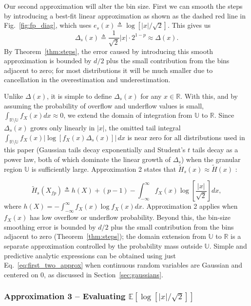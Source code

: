 \documentclass[12pt,onecolumn, margin=1in]{IEEEtran}
\newcommand{\bracket}[1]{\left[ #1 \right]}
\newcommand{\Ht}{\tilde{H}}
\begin{document}
Our second approximation will alter the bin size. First we can smooth the steps by introducing a best-fit linear approximation as shown as the dashed red line in Fig.~\ref{fig:fp_diag}, which uses $e_{s}(x) \triangleq \log[|x|/\sqrt{2}]$. This gives us
\begin{equation}
    \label{eq:step_approx}
    \Delta_s(x) \triangleq \frac{1}{\sqrt{2}}|x| \cdot 2^{1-p} \approx \Delta(x).
\end{equation}
By Theorem~\ref{thm:steps}, the error caused by introducing this smooth approximation is bounded by $d/2$ plus the small contribution from the bins adjacent to zero; for most distributions it will be much smaller due to cancellation in the overestimation and underestimation.

Unlike $\Delta(x)$, it is simple to define $\Delta_s(x)$ for any $x \in \mathbb{R}$. With this, and by assuming the probability of overflow and underflow values is small, $\int_{\mathbb{R} \setminus \mathbb{U}} f_X(x) dx \approx 0$, we extend the domain of integration from $\mathbb{U}$ to $\mathbb{R}$. Since $\Delta_s(x)$ grows only linearly in $|x|$, the omitted tail integral $\int_{\mathbb{R}\setminus\mathbb{U}} f_X(x)|\log[f_X(x)\Delta_s(x)]|\,dx$ is near zero for all distributions used in this paper (Gaussian tails decay exponentially and Student's $t$ tails decay as a power law, both of which dominate the linear growth of $\Delta_s$) when the granular region $\mathbb{U}$ is sufficiently large. Approximation 2 states that $\Ht_s(x) \approx \tilde H(x)$ :

\begin{equation}
    \label{eq:first_two_approx}
    \Ht_s(X_{fp}) \triangleq h(X) + (p-1)- \int^\infty_{-\infty} f_X(x) \log\bracket{\frac{|x|}{\sqrt{2}}} dx,
\end{equation}
where $h(X) = -\int^\infty_{-\infty} f_X(x) \log f_X(x) dx$. Approximation 2 applies when $f_X(x)$ has low overflow or underflow probability. Beyond this, the bin-size smoothing error is bounded by $d/2$ plus the small contribution from the bins adjacent to zero (Theorem~\ref{thm:steps}); the domain extension from $\mathbb{U}$ to $\mathbb{R}$ is a separate approximation controlled by the probability mass outside $\mathbb{U}$. Simple and predictive analytic expressions can be obtained using just Eq.~\eqref{eq:first_two_approx} when continuous random variables are Gaussian and centered on 0, as discussed in Section~\ref{sec:gaussians}. 

\subsubsection*{Approximation 3 -- Evaluating $\mathbb{E}[\log[|x|/\sqrt{2}]]$}
\end{document}
